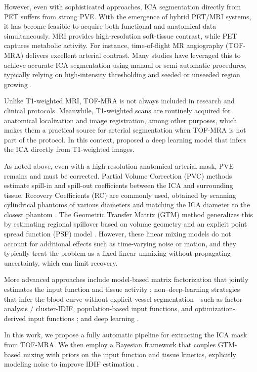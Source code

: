 However, even with sophisticated approaches, ICA segmentation directly from PET suffers from strong PVE.
With the emergence of hybrid PET/MRI systems, it has become feasible to acquire both functional and anatomical data simultaneously.
MRI provides high-resolution soft-tissue contrast, while PET captures metabolic activity.
For instance, time-of-flight MR angiography (TOF-MRA) delivers excellent arterial contrast.
Many studies have leveraged this to achieve accurate ICA segmentation using manual or semi-automatic procedures, typically relying on high-intensity thresholding and seeded or unseeded region growing \cite{feng2015image,sundar2019towards,sari2017estimation,jochimsen2016fully}.

Unlike T1-weighted MRI, TOF-MRA is not always included in research and clinical protocols.
Meanwhile, T1-weighted scans are routinely acquired for anatomical localization and image registration, among other purposes, which makes them a practical source for arterial segmentation when TOF-MRA is not part of the protocol.
In this context, \citeauthor{rahman2024deep} \cite{rahman2024deep} proposed a deep learning model that infers the ICA directly from T1-weighted images.

As noted above, even with a high-resolution anatomical arterial mask, PVE remains and must be corrected.
Partial Volume Correction (PVC) methods estimate spill-in and spill-out coefficients between the ICA and surrounding tissue.
Recovery Coefficients (RC) are commonly used, obtained by scanning cylindrical phantoms of various diameters and matching the ICA diameter to the closest phantom \cite{dassanayake2022caliper,lyoo2014image}.
The Geometric Transfer Matrix (GTM) method generalizes this by estimating regional spillover based on volume geometry and an explicit point spread function (PSF) model \cite{rousset1998correction}.
However, these linear mixing models do not account for additional effects such as time-varying noise or motion, and they typically treat the problem as a fixed linear unmixing without propagating uncertainty, which can limit recovery.

More advanced approaches include model-based matrix factorization that jointly estimates the input function and tissue activity \cite{fang2022image}; non–deep-learning strategies that infer the blood curve without explicit vessel segmentation—such as factor analysis / cluster-IDIF, population-based input functions, and optimization-derived input functions \cite{simoncic2015image,lyoo2014image,dias2022clinical}; and deep learning \cite{kawauchi2023convolutional}.

In this work, we propose a fully automatic pipeline for extracting the ICA mask from TOF-MRA.
We then employ a Bayesian framework that couples GTM-based mixing with priors on the input function and tissue kinetics, explicitly modeling noise to improve IDIF estimation \cite{irace2021bayesian}.

